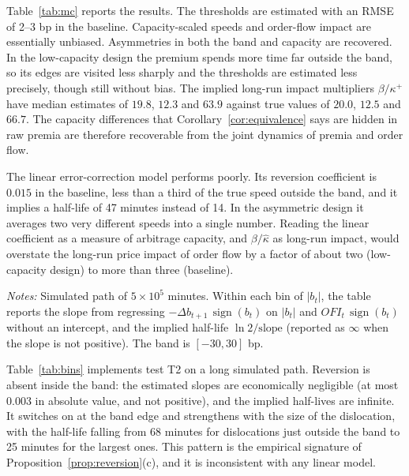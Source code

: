 \documentclass[12pt]{article}
\theoremstyle{definition}
\theoremstyle{remark}
\newcommand{\sgn}{\operatorname{sign}}
\begin{document}
Table~\ref{tab:mc} reports the results. The thresholds are estimated with an RMSE of 2--3 bp in the baseline. Capacity-scaled speeds and order-flow impact are essentially unbiased. Asymmetries in both the band and capacity are recovered. In the low-capacity design the premium spends more time far outside the band, so its edges are visited less sharply and the thresholds are estimated less precisely, though still without bias. The implied long-run impact multipliers $\beta/\kappa^+$ have median estimates of $19.8$, $12.3$ and $63.9$ against true values of $20.0$, $12.5$ and $66.7$. The capacity differences that Corollary~\ref{cor:equivalence} says are hidden in raw premia are therefore recoverable from the joint dynamics of premia and order flow.

The linear error-correction model performs poorly. Its reversion coefficient is $0.015$ in the baseline, less than a third of the true speed outside the band, and it implies a half-life of 47 minutes instead of 14. In the asymmetric design it averages two very different speeds into a single number. Reading the linear coefficient as a measure of arbitrage capacity, and $\beta/\hat\kappa$ as long-run impact, would overstate the long-run price impact of order flow by a factor of about two (low-capacity design) to more than three (baseline).

\begin{table}[t]
\centering
\caption{\textbf{Reversion speed by size of dislocation (baseline design)}}
\label{tab:bins}
\small

\begin{minipage}{0.92\textwidth}
\footnotesize
\vspace{4pt}
\emph{Notes:} Simulated path of $5\times10^5$ minutes. Within each bin of $|b_t|$, the table reports the slope from regressing $-\Delta b_{t+1}\,\sgn(b_t)$ on $|b_t|$ and $\mathit{OFI}_t\,\sgn(b_t)$ without an intercept, and the implied half-life $\ln2/\text{slope}$ (reported as $\infty$ when the slope is not positive). The band is $[-30,30]$ bp.
\end{minipage}
\end{table}

Table~\ref{tab:bins} implements test T2 on a long simulated path. Reversion is absent inside the band: the estimated slopes are economically negligible (at most $0.003$ in absolute value, and not positive), and the implied half-lives are infinite. It switches on at the band edge and strengthens with the size of the dislocation, with the half-life falling from 68 minutes for dislocations just outside the band to 25 minutes for the largest ones. This pattern is the empirical signature of Proposition~\ref{prop:reversion}(c), and it is inconsistent with any linear model.
\end{document}

